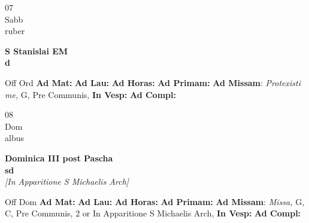 \documentclass[10pt, openany]{book}
\begin{document}
    \begin{center}
        \begin{minipage}{3.5in}
            \vspace{2em}
            \begin{minipage}{0.5in}
                {\Huge 07} \\
                {\normalsize Sabb} \\
                {\normalsize ruber}
            \end{minipage}
            \begin{minipage}{3.0in}
                \textbf{ \large S Stanislai EM \\
                \textnormal{\normalsize d}} \\ 
            \end{minipage}
            \begin{justify}Off Ord
                \textbf{Ad Mat: }
                \textbf{Ad Lau: }
                \textbf{Ad Horas: }
                \textbf{Ad Primam: }\textbf{Ad Missam}: \textit{Protexisti me,} G, Pre Communis,  
                \textbf{In Vesp: }
                \textbf{Ad Compl: }
            \end{justify}
        \end{minipage}
    \end{center}

    \begin{center}
        \begin{minipage}{3.5in}
            \vspace{2em}
            \begin{minipage}{0.5in}
                {\Huge 08} \\
                {\normalsize Dom} \\
                {\normalsize albus}
            \end{minipage}
            \begin{minipage}{3.0in}
                \textbf{ \large Dominica III post Pascha \\
                \textnormal{\normalsize sd}} \\ \textit{[In Apparitione S Michaelis Arch]} \\ 
            \end{minipage}
            \begin{justify}Off Dom
                \textbf{Ad Mat: }
                \textbf{Ad Lau: }
                \textbf{Ad Horas: }
                \textbf{Ad Primam: }\textbf{Ad Missam}: \textit{Missa,} G, C, Pre Communis, 2 or In Apparitione S Michaelis Arch,  
                \textbf{In Vesp: }
                \textbf{Ad Compl: }
            \end{justify}
        \end{minipage}
    \end{center}
\end{document}
